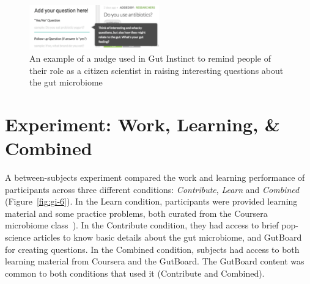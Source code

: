 
\begin{figure}[h]
  \centering
  \includegraphics[width=0.5\textwidth]{figures/gutinstinct/gi-5.png}
  \caption[An example of a nudge used in Gut Instinct]
{An example of a nudge used in Gut Instinct to remind people of their role as a citizen scientist in raising interesting questions about the gut microbiome }
  \label{fig:gi-5}
\end{figure} 

\section{Experiment: Work, Learning, \& Combined}
A between-subjects experiment compared the work and learning performance of participants across three different conditions: \textit{Contribute}, \textit{Learn} and \textit{Combined} (Figure~\ref{fig:gi-6}). In the Learn condition, participants were provided learning material and some practice problems, both curated from the Coursera microbiome class~\cite{Knight2016}). In the Contribute condition, they had access to brief pop-science articles to know basic details about the gut microbiome, and GutBoard for creating questions. In the Combined condition, subjects had access to both learning material from Coursera and the GutBoard. The GutBoard content was common to both conditions that used it (Contribute and Combined).

